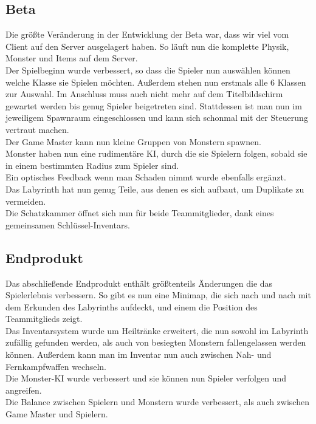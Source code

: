\documentclass[10pt,a4paper,notitlepage]{scrreprt}
\begin{document}
			\subsection{Beta}
			
			Die größte Veränderung in der Entwicklung der Beta war, dass wir viel vom Client auf den Server ausgelagert haben. So läuft nun die komplette Physik, Monster und Items auf dem Server.\\
			Der Spielbeginn wurde verbessert, so dass die Spieler nun auswählen können welche Klasse sie Spielen möchten. Außerdem stehen nun erstmals alle 6 Klassen zur Auswahl. Im Anschluss muss auch nicht mehr auf dem Titelbildschirm gewartet werden bis genug Spieler beigetreten sind. Stattdessen ist man nun im jeweiligem Spawnraum eingeschlossen und kann sich schonmal mit der Steuerung vertraut machen.\\
			Der Game Master kann nun kleine Gruppen von Monstern spawnen.\\
			Monster haben nun eine rudimentäre KI, durch die sie Spielern folgen, sobald sie in einem bestimmten Radius zum Spieler sind.\\
			Ein optisches Feedback wenn man Schaden nimmt wurde ebenfalls ergänzt.\\
			Das Labyrinth hat nun genug Teile, aus denen es sich aufbaut, um Duplikate zu vermeiden.\\
			Die Schatzkammer öffnet sich nun für beide Teammitglieder, dank eines gemeinsamen Schlüssel-Inventars.\\
			
			\subsection{Endprodukt}
			
			Das abschließende Endprodukt enthält größtenteils Änderungen die das Spielerlebnis verbessern. So gibt es nun eine Minimap, die sich nach und nach mit dem Erkunden des Labyrinths aufdeckt, und einem die Position des Teammitglieds zeigt.\\
			Das Inventarsystem wurde um Heiltränke erweitert, die nun sowohl im Labyrinth zufällig gefunden werden, als auch von besiegten Monstern fallengelassen werden können. Außerdem kann man im Inventar nun auch zwischen Nah- und Fernkampfwaffen wechseln.\\
			Die Monster-KI wurde verbessert und sie können nun Spieler verfolgen und angreifen.\\
			Die Balance zwischen Spielern und Monstern wurde verbessert, als auch zwischen Game Master und Spielern.\\
\end{document}
